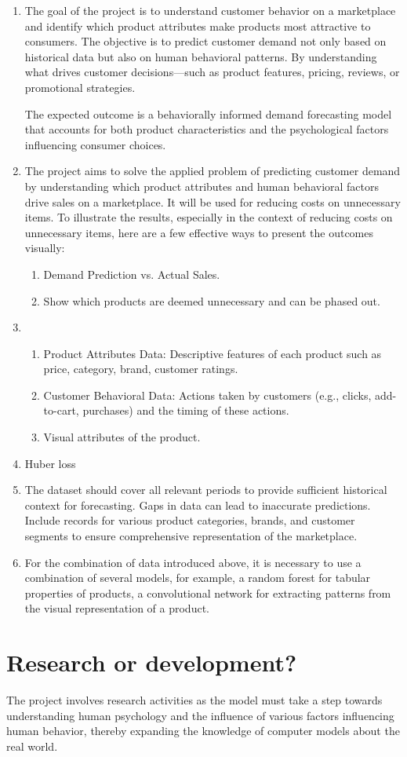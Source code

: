 \documentclass[12pt]{article}
\begin{document}
\begin{enumerate}
\item The goal of the project is to understand customer behavior on a marketplace and identify which product attributes make products most attractive to consumers. The objective is to predict customer demand not only based on historical data but also on human behavioral patterns. By understanding what drives customer decisions—such as product features, pricing, reviews, or promotional strategies.

The expected outcome is a behaviorally informed demand forecasting model that accounts for both product characteristics and the psychological factors influencing consumer choices.

\item The project aims to solve the applied problem of predicting customer demand by understanding which product attributes and human behavioral factors drive sales on a marketplace. It will be used for reducing costs on unnecessary items. 
To illustrate the results, especially in the context of reducing costs on unnecessary items, here are a few effective ways to present the outcomes visually:
	\begin{enumerate}
	\item Demand Prediction vs. Actual Sales.
	\item Show which products are deemed unnecessary and can be phased out.
	\end{enumerate}

\item
\begin{enumerate} 
	\item Product Attributes Data: Descriptive features of each product such as price, category, brand, customer ratings. 
	\item Customer Behavioral Data: Actions taken by customers (e.g., clicks, add-to-cart, purchases) and the timing of these actions.
	\item Visual attributes of the product.
\end{enumerate}

\item Huber loss
\item The dataset should cover all relevant periods to provide sufficient historical context for forecasting. Gaps in data can lead to inaccurate predictions.
Include records for various product categories, brands, and customer segments to ensure comprehensive representation of the marketplace.
\item For the combination of data introduced above, it is necessary to use a combination of several models, for example, a random forest for tabular properties of products, a convolutional network for extracting patterns from the visual representation of a product.
\end{enumerate}

\section{Research or development?}
The project involves research activities as the model must take a step towards understanding human psychology and the influence of various factors influencing human behavior, thereby expanding the knowledge of computer models about the real world.
\end{document}
